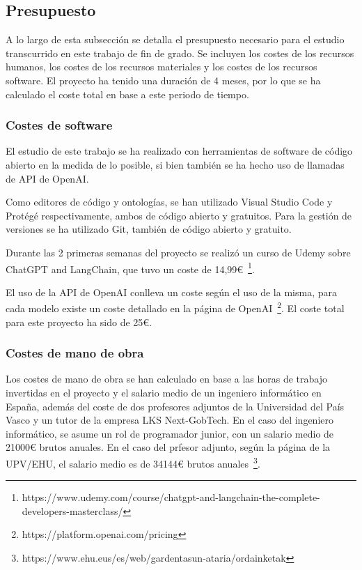 \subsection{Presupuesto}
A lo largo de esta subsección se detalla el presupuesto necesario para el estudio transcurrido en este trabajo de fin de grado. Se incluyen los costes de los recursos humanos, los costes de los recursos materiales y los costes de los recursos software. El proyecto ha tenido una duración de 4 meses, por lo que se ha calculado el coste total en base a este periodo de tiempo.

\subsubsection{Costes de software}
El estudio de este trabajo se ha realizado con herramientas de software de código abierto en la medida de lo posible, si bien también se ha hecho uso de llamadas de API de OpenAI.

Como editores de código y ontologías, se han utilizado Visual Studio Code y Protégé respectivamente, ambos de código abierto y gratuitos. Para la gestión de versiones se ha utilizado Git, también de código abierto y gratuito.

Durante las 2 primeras semanas del proyecto se realizó un curso de Udemy sobre ChatGPT and LangChain, que tuvo un coste de 14,99€~\footnote{https://www.udemy.com/course/chatgpt-and-langchain-the-complete-developers-masterclass/}.

El uso de la API de OpenAI conlleva un coste según el uso de la misma, para cada modelo existe un coste detallado en la página de OpenAI~\footnote{https://platform.openai.com/pricing}. El coste total para este proyecto ha sido de 25€.


\subsubsection{Costes de mano de obra}
Los costes de mano de obra se han calculado en base a las horas de trabajo invertidas en el proyecto y el salario medio de un ingeniero informático en España, además del coste de dos profesores adjuntos de la Universidad del País Vasco y un tutor de la empresa LKS Next-GobTech.
En el caso del ingeniero informático, se asume un rol de programador junior, con un salario medio de 21000€ brutos anuales. 
En el caso del prfesor adjunto, según la página de la UPV/EHU, el salario medio es de 34144€ brutos anuales~\footnote{https://www.ehu.eus/es/web/gardentasun-ataria/ordainketak}. 

